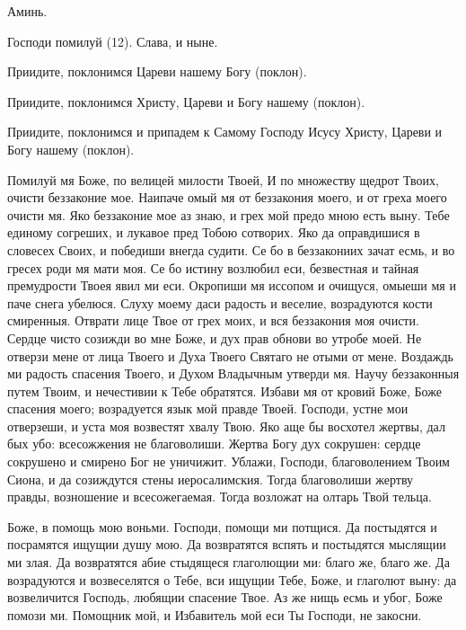 Аминь.

Господи помилуй (12). Слава, и ныне.

Приидите, поклонимся Цареви нашему Богу (поклон).

Приидите, поклонимся Христу, Цареви и Богу нашему (поклон).

Приидите, поклонимся и припадем к Самому Господу Исусу Христу, Цареви и Богу нашему (поклон).




Помилуй мя Боже, по велицей милости Твоей, И по множеству щедрот Твоих, очисти беззаконие мое. Наипаче омый мя от беззакония моего, и от греха моего очисти мя. Яко беззаконие мое аз знаю, и грех мой предо мною есть выну. Тебе единому согреших, и лукавое пред Тобою сотворих. Яко да оправдишися в словесех Своих, и победиши внегда судити. Се бо в беззакониих зачат есмь, и во гресех роди мя мати моя. Се бо истину возлюбил еси, безвестная и тайная премудрости Твоея явил ми еси. Окропиши мя иссопом и очищуся, омыеши мя и паче снега убелюся. Слуху моему даси радость и веселие, возрадуются кости смиренныя. Отврати лице Твое от грех моих, и вся беззакония моя очисти. Сердце чисто созижди во мне Боже, и дух прав обнови во утробе моей. Не отверзи мене от лица Твоего и Духа Твоего Святаго не отыми от мене. Воздаждь ми радость спасения Твоего, и Духом Владычным утверди мя. Научу беззаконныя путем Твоим, и нечестивии к Тебе обратятся. Избави мя от кровий Боже, Боже спасения моего; возрадуется язык мой правде Твоей. Господи, устне мои отверзеши, и уста моя возвестят хвалу Твою. Яко аще бы восхотел жертвы, дал бых убо: всесожжения не благоволиши. Жертва Богу дух сокрушен: сердце сокрушено и смирено Бог не уничижит. Ублажи, Господи, благоволением Твоим Сиона, и да созиждутся стены иеросалимския. Тогда благоволиши жертву правды, возношение и всесожегаемая. Тогда возложат на олтарь Твой тельца.




Боже, в помощь мою воньми. Господи, помощи ми потщися. Да постыдятся и посрамятся ищущии душу мою. Да возвратятся вспять и постыдятся мыслящии ми злая. Да возвратятся абие стыдящеся глаголющии ми: благо же, благо же. Да возрадуются и возвеселятся о Тебе, вси ищущии Тебе, Боже, и глаголют выну: да возвеличится Господь, любящии спасение Твое. Аз же нищь есмь и убог, Боже помози ми. Помощник мой, и Избавитель мой еси Ты  Господи, не закосни.




